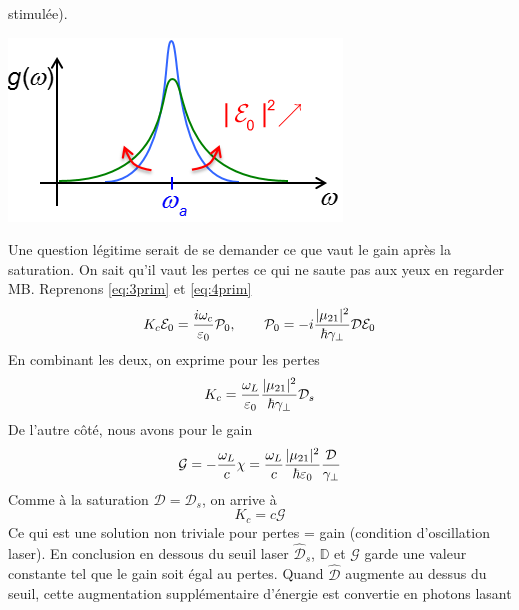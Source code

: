 \begin{enumerate}
stimulée).
\begin{center}
	\includegraphics[scale=0.5]{ch3/image11.png}
\end{center}
\end{enumerate}
Une question légitime serait de se demander ce que vaut le gain après la saturation. On sait 
qu'il vaut les pertes ce qui ne saute pas aux yeux en regarder MB. Reprenons \eqref{eq:3prim} et 
\eqref{eq:4prim}
\begin{equation}
{K_c}{{\cal E}_0} = \frac{{i{\omega _c}}}{{{\varepsilon _0}}}{{\cal P}_0},\qquad 
{{\cal P}_0} =  - i\frac{{|{\mu _{21}}{|^2}}}{{\hbar {\gamma _ \bot }}}{\cal D}{{\cal E}_0}
\end{equation}
En combinant les deux, on exprime pour les pertes
\begin{equation}
{K_c} = \frac{{{\omega _L}}}{{{\varepsilon _0}}}\frac{{|{\mu _{21}}{|^2}}}{{\hbar {\gamma _ \bot }}}{{\cal D}_s}
\end{equation}
De l'autre côté, nous avons pour le gain
\begin{equation}
{{\cal G}} =  - \frac{{{\omega _L}}}{c}\chi  = \frac{{{\omega _L}}}{c}\frac{{|{\mu _{21}}{|^2}}}{{\hbar {\varepsilon _0}}}\frac{{\cal D}}{{{\gamma _ \bot }}}
\end{equation}
Comme à la saturation $\mathcal{D}=\mathcal{D}_s$, on arrive à 
\begin{equation}
K_c=c\mathcal{G}
\end{equation}
Ce qui est une solution non triviale pour pertes = gain (condition d'oscillation laser). En 
conclusion en dessous du seuil laser $\hat{\mathcal{D}}_s$, $\mathbb{D}$ et $\mathcal{G}$ garde une 
valeur constante tel que le gain soit égal au pertes. Quand $\hat{\mathcal{D}}$ augmente au 
dessus du seuil, cette augmentation supplémentaire d'énergie est convertie en photons lasant

